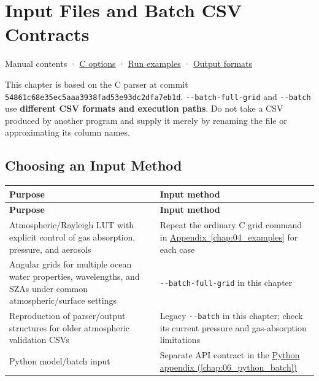 \chapter{Input Files and Batch CSV Contracts}
\label{chap:08_input_formats}
Manual contents · \hyperref[chap:03_options]{C options} · \hyperref[chap:04_examples]{Run examples} · \hyperref[chap:05_output_formats]{Output formats}

This chapter is based on the C parser at commit \texttt{54861c68e35ec5aa\allowbreak{}a3938fad53e93dc2\allowbreak{}dfa7eb1d}. \texttt{-\allowbreak{}-\allowbreak{}batch-\allowbreak{}full-\allowbreak{}grid} and \texttt{-\allowbreak{}-\allowbreak{}batch} use \textbf{different CSV formats and execution paths}. Do not take a CSV produced by another program and supply it merely by renaming the file or approximating its column names.

\section{Choosing an Input Method}
\label{sec:auto:08_input_formats:1}

{\TableFont
\begin{longtable}{@{}>{\raggedright\arraybackslash}p{}>{\raggedright\arraybackslash}p{}@{}}
\toprule
\textbf{Purpose} & \textbf{Input method} \\
\midrule
\endfirsthead
\toprule
\textbf{Purpose} & \textbf{Input method} \\
\midrule
\endhead
\bottomrule
\endfoot
Atmospheric/Rayleigh LUT with explicit control of gas absorption, pressure, and aerosols & Repeat the ordinary C grid command in \hyperref[chap:04_examples]{Appendix~\ref*{chap:04_examples}} for each case \\
Angular grids for multiple ocean water properties, wavelengths, and SZAs under common atmospheric/surface settings & \texttt{-\allowbreak{}-\allowbreak{}batch-\allowbreak{}full-\allowbreak{}grid} in this chapter \\
Reproduction of parser/output structures for older atmospheric validation CSVs & Legacy \texttt{-\allowbreak{}-\allowbreak{}batch} in this chapter; check its current pressure and gas-absorption limitations \\
Python model/batch input & Separate API contract in the \hyperref[chap:06_python_batch]{Python appendix (\ref*{chap:06_python_batch})} \\
\end{longtable}
}

